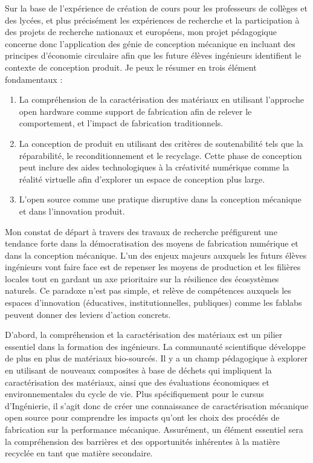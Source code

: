 \documentclass[
  11pt,
]{article}
\providecommand{\tightlist}{%
  \setlength{\itemsep}{0pt}\setlength{\parskip}{0pt}}\usepackage{longtable,booktabs,array}
\begin{document}
Sur la base de l'expérience de création de cours pour les professeurs de
collèges et des lycées, et plus précisément les expériences de recherche
et la participation à des projets de recherche nationaux et européens,
mon projet pédagogique concerne donc l'application des génie de
conception mécanique en incluant des principes d'économie circulaire
afin que les future élèves ingénieurs identifient le contexte de
conception produit. Je peux le résumer en trois élément fondamentaux :

\begin{enumerate}
\def\labelenumi{\arabic{enumi}.}
\tightlist
\item
  La compréhension de la caractérisation des matériaux en utilisant
  l'approche open hardware comme support de fabrication afin de relever
  le comportement, et l'impact de fabrication traditionnels.
\item
  La conception de produit en utilisant des critères de soutenabilité
  tels que la réparabilité, le reconditionnement et le recyclage. Cette
  phase de conception peut inclure des aides technologiques à la
  créativité numérique comme la réalité virtuelle afin d'explorer un
  espace de conception plus large.
\item
  L'open source comme une pratique disruptive dans la conception
  mécanique et dans l'innovation produit.
\end{enumerate}

Mon constat de départ à travers des travaux de recherche préfigurent une
tendance forte dans la démocratisation des moyens de fabrication
numérique et dans la conception mécanique. L'un des enjeux majeurs
auxquels les futurs élèves ingénieurs vont faire face est de repenser
les moyens de production et les filières locales tout en gardant un axe
prioritaire sur la résilience des écosystèmes naturels. Ce paradoxe
n'est pas simple, et relève de compétences auxquels les espaces
d'innovation (éducatives, institutionnelles, publiques) comme les
fablabs peuvent donner des leviers d'action concrets.

D'abord, la compréhension et la caractérisation des matériaux est un
pilier essentiel dans la formation des ingénieurs. La communauté
scientifique développe de plus en plus de matériaux bio-sourcés. Il y a
un champ pédagogique à explorer en utilisant de nouveaux composites à
base de déchets qui impliquent la caractérisation des matériaux, ainsi
que des évaluations économiques et environnementales du cycle de vie.
Plus spécifiquement pour le cursus d'Ingénierie, il s'agit donc de créer
une connaissance de caractérisation mécanique open source pour
comprendre les impacts qu'ont les choix des procédés de fabrication sur
la performance mécanique. Assurément, un élément essentiel sera la
compréhension des barrières et des opportunités inhérentes à la matière
recyclée en tant que matière secondaire.
\end{document}
